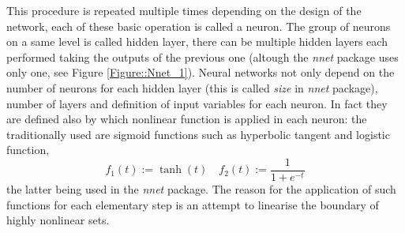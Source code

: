 \documentclass[a4paper,12pt]{article}
\begin{document}
This procedure is repeated multiple times depending on the design of the network, each of these basic operation is called a neuron.
The group of neurons on a same level is called hidden layer, there can be multiple hidden layers each performed taking the outputs of the previous one (altough the \textit{nnet} package uses only one, see Figure \ref{Figure::Nnet_1}).
Neural networks not only depend on the number of neurons for each hidden layer (this is called \textit{size} in \textit{nnet} package), number of layers and definition of input variables for each neuron. In fact they are defined also by which nonlinear function is applied in each neuron: the traditionally used are sigmoid functions such as hyperbolic tangent and logistic function, $$f_{1}(t):=\tanh(t) \quad f_{2}(t):= \frac{1}{1+ e^{-t}} $$ the latter being used in the \textit{nnet} package. The reason for the application of such functions for each elementary step is an attempt to linearise the boundary of highly nonlinear sets. 
\end{document}
